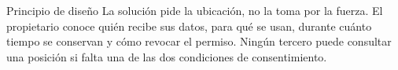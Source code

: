 \begin{nota}{Principio de diseño}
La solución pide la ubicación, no la toma por la fuerza. El propietario conoce quién recibe sus datos, para qué se usan, durante cuánto tiempo se conservan y cómo revocar el permiso. Ningún tercero puede consultar una posición si falta una de las dos condiciones de consentimiento.
\end{nota}
